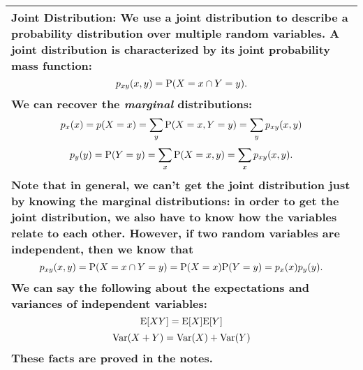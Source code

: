 {\tabulinesep=1mm
\begin{tabu}{|p{16cm} |}
\hline
\textbf{Joint Distribution}: We use a joint distribution to describe a probability distribution over multiple random variables. A joint distribution is characterized by its joint probability mass function: 
\[p_{xy}(x,y) =\P(X=x \cap Y=y).\]
We can recover the \textit{marginal} distributions:
\[p_x(x) = p(X=x) = \sum_y \P(X=x, Y=y) = \sum_y p_{xy}(x, y)\] 
\[p_y(y) = \P(Y=y) = \sum_x \P(X=x, y) = \sum_x p_{xy}(x,y).\]
Note that in general, we can't get the joint distribution just by knowing the marginal distributions: in order to get the joint distribution, we also have to know how the variables relate to each other. However, if two random variables are \textbf{independent}, then we know that 
\[p_{xy}(x,y) = \P(X=x \cap Y=y) = \P(X=x)\P(Y=y) = p_x(x)p_y(y).\]
We can say the following about the expectations and variances of independent variables:
 \[\E[XY] = \E[X]\E[Y]\]
 \[\var(X+Y) = \var(X) + \var(Y)\]
These facts are proved in the notes.

\\
\hline
\end{tabu}

}
